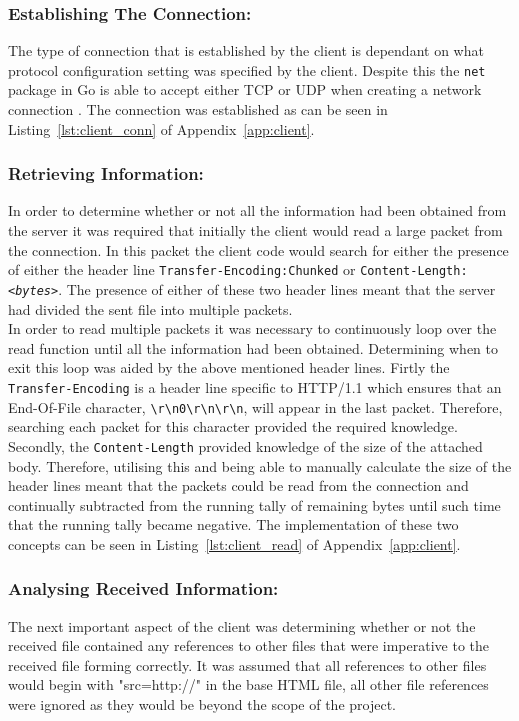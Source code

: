 \documentclass[10pt,twocolumn]{witseiepaper}
\begin{document}
		\subsubsection*{Establishing The Connection:} The type of connection that is established by the client is dependant on what protocol configuration setting was specified by the client. Despite this the \texttt{net} package in Go is able to accept either TCP or UDP when creating a network connection \cite{net}. The connection was established as can be seen in Listing~\ref{lst:client_conn} of Appendix~\ref{app:client}. 
		
		\subsubsection*{Retrieving Information:} In order to determine whether or not all the information had been obtained from the server it was required that initially the client would read a large packet from the connection. In this packet the client code would search for either the presence of either the header line \texttt{Transfer-Encoding:Chunked} or \texttt{Content-Length:\textit{<bytes>}}. The presence of either of these two header lines meant that the server had divided the sent file into multiple packets. \\
		
		In order to read multiple packets it was necessary to continuously loop over the read function until all the information had been obtained. Determining when to exit this loop was aided by the above mentioned header lines. Firtly the \texttt{Transfer-Encoding} is a header line specific to HTTP/1.1 which ensures that an End-Of-File character, \texttt{\textbackslash r\textbackslash n0\textbackslash r\textbackslash n\textbackslash r\textbackslash n}, will appear in the last packet. Therefore, searching each packet for this character provided the required knowledge. Secondly, the \texttt{Content-Length} provided knowledge of the size of the attached body. Therefore, utilising this and being able to manually calculate the size of the header lines meant that the packets could be read from the connection and continually subtracted from the running tally of remaining bytes until such time that the running tally became negative. The implementation of these two concepts can be seen in Listing~\ref{lst:client_read} of Appendix~\ref{app:client}. 
		
		\subsubsection*{Analysing Received Information:} The next important aspect of the client was determining whether or not the received file contained any references to other files that were imperative to the received file forming correctly. It was assumed that all references to other files would begin with "src=http://" in the base HTML file, all other file references were ignored as they would be beyond the scope of the project.\\
		
\end{document}
